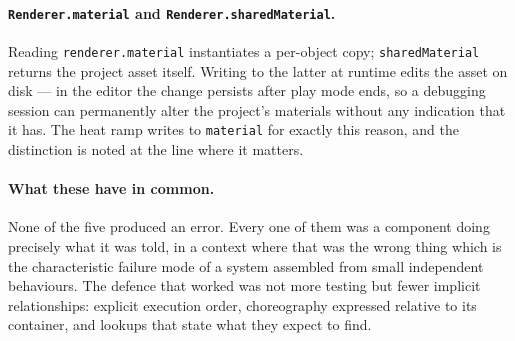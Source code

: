 \paragraph{\texttt{Renderer.material} and \texttt{Renderer.sharedMaterial}.}
Reading \texttt{renderer.material} instantiates a per-object copy;
\texttt{sharedMaterial} returns the project asset itself. Writing to the latter at runtime edits the asset on disk --- in the editor the change persists after play mode ends, so a debugging session can permanently alter the project's materials without any indication that it has. The heat ramp writes to \texttt{material} for exactly this reason, and the distinction is noted at the line where it matters.

\paragraph{What these have in common.}
None of the five produced an error. Every one of them was a component doing precisely what it was told, in a context where that was the wrong thing which is the characteristic failure mode of a system assembled from small independent behaviours. The defence that worked was not more testing but fewer implicit relationships: explicit execution order, choreography expressed relative to its container, and lookups that state what they expect to find.